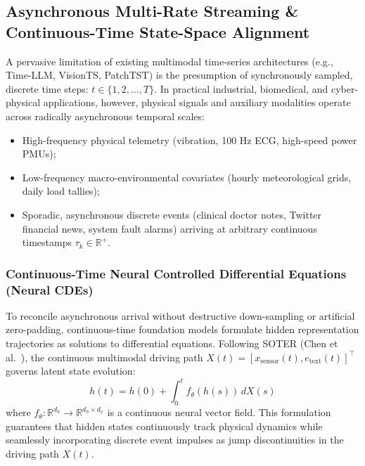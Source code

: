 \subsection{Asynchronous Multi-Rate Streaming \& Continuous-Time State-Space Alignment}
\label{sec:continuous_ssm}
A pervasive limitation of existing multimodal time-series architectures (e.g., Time-LLM, VisionTS, PatchTST) is the presumption of synchronously sampled, discrete time steps: $t \in \{1, 2, \dots, T\}$. In practical industrial, biomedical, and cyber-physical applications, however, physical signals and auxiliary modalities operate across radically asynchronous temporal scales:
\begin{itemize}
    \item High-frequency physical telemetry (vibration, 100 Hz ECG, high-speed power PMUs);
    \item Low-frequency macro-environmental covariates (hourly meteorological grids, daily load tallies);
    \item Sporadic, asynchronous discrete events (clinical doctor notes, Twitter financial news, system fault alarms) arriving at arbitrary continuous timestamps $\tau_k \in \mathbb{R}^+$.
\end{itemize}

\subsubsection{Continuous-Time Neural Controlled Differential Equations (Neural CDEs)}
To reconcile asynchronous arrival without destructive down-sampling or artificial zero-padding, continuous-time foundation models formulate hidden representation trajectories as solutions to differential equations. Following SOTER (Chen et al.~\cite{Chen2026SOTER}), the continuous multimodal driving path $X(t) = [x_{\text{sensor}}(t), e_{\text{text}}(t)]^\top$ governs latent state evolution:
\begin{equation}
    h(t) = h(0) + \int_0^t f_\theta(h(s)) \, dX(s)
\end{equation}
where $f_\theta: \mathbb{R}^{d_h} \to \mathbb{R}^{d_h \times d_x}$ is a continuous neural vector field. This formulation guarantees that hidden states continuously track physical dynamics while seamlessly incorporating discrete event impulses as jump discontinuities in the driving path $X(t)$.

